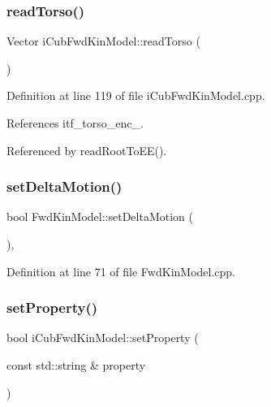 \subsubsection{\texorpdfstring{read\+Torso()}{readTorso()}}
{\footnotesize\ttfamily Vector i\+Cub\+Fwd\+Kin\+Model\+::read\+Torso (\begin{DoxyParamCaption}{ }\end{DoxyParamCaption})\hspace{0.3cm}{\ttfamily [protected]}}



Definition at line 119 of file i\+Cub\+Fwd\+Kin\+Model.\+cpp.



References itf\+\_\+torso\+\_\+enc\+\_\+.



Referenced by read\+Root\+To\+E\+E().

\mbox{\label{classFwdKinModel_a12b54bd62ba5cf218973c600c66ba39e}} 
\subsubsection{\texorpdfstring{set\+Delta\+Motion()}{setDeltaMotion()}}
{\footnotesize\ttfamily bool Fwd\+Kin\+Model\+::set\+Delta\+Motion (\begin{DoxyParamCaption}{ }\end{DoxyParamCaption})\hspace{0.3cm}{\ttfamily [protected]}, {\ttfamily [inherited]}}



Definition at line 71 of file Fwd\+Kin\+Model.\+cpp.

\mbox{\label{classiCubFwdKinModel_a2daa3bb3b2c458200dc487ac00929260}} 
\subsubsection{\texorpdfstring{set\+Property()}{setProperty()}}
{\footnotesize\ttfamily bool i\+Cub\+Fwd\+Kin\+Model\+::set\+Property (\begin{DoxyParamCaption}\item[{const std\+::string \&}]{property }\end{DoxyParamCaption})\hspace{0.3cm}{\ttfamily [override]}}




